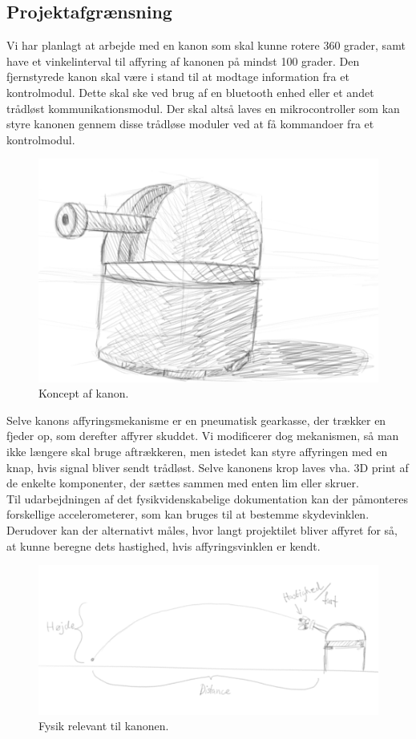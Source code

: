 \subsection{Projektafgrænsning}

Vi har planlagt at arbejde med en kanon som skal kunne rotere 360 grader, samt have et vinkelinterval til affyring af kanonen på mindst 100 grader. Den fjernstyrede kanon skal være i stand til at modtage information fra et kontrolmodul. Dette skal ske ved brug af en bluetooth enhed eller et andet trådløst kommunikationsmodul. Der skal altså laves en mikrocontroller som kan styre kanonen gennem disse trådløse moduler ved at få kommandoer fra et kontrolmodul.\\

\begin{figure}[H]
\centering
\includegraphics[scale=0.4]{Billeder/Koncept_turret.png}
\caption{Koncept af kanon.}
\label{fig:KonceptKanon}
\end{figure}

Selve kanons affyringsmekanisme er en pneumatisk gearkasse, der trækker en fjeder op, som derefter affyrer skuddet. Vi modificerer dog mekanismen, så man ikke længere skal bruge aftrækkeren, men istedet kan styre affyringen med en knap, hvis signal bliver sendt trådløst. Selve kanonens krop laves vha. 3D print af de enkelte komponenter, der sættes sammen med enten lim eller skruer. \\

Til udarbejdningen af det fysikvidenskabelige dokumentation kan der påmonteres forskellige accelerometerer, som kan bruges til at bestemme skydevinklen. Derudover kan der alternativt måles, hvor langt projektilet bliver affyret for så, at kunne beregne dets hastighed, hvis affyringsvinklen er kendt.

\begin{figure}[H]
\centering
\includegraphics[scale=0.4]{Billeder/Fysik_koncept.png}
\caption{Fysik relevant til kanonen.}
\label{fig:FysikKoncept}
\end{figure}